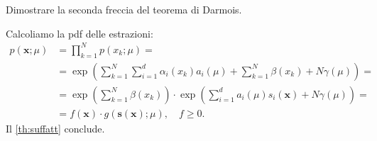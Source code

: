 \begin{exercise}
	Dimostrare la seconda freccia del teorema di Darmois.
\end{exercise}

\begin{solution}
	Calcoliamo la pdf delle estrazioni:
	\begin{align*}
		p(\mathbf x;\mu)
		&= \prod_{k=1}^N p(x_k;\mu) = \\
		&= \exp \left( \sum_{k=1}^N \sum_{i=1}^d \alpha_i(x_k)a_i(\mu)
		+ \sum_{k=1}^N \beta(x_k) + N\gamma(\mu) \right) = \\
		&= \exp \left( \sum_{k=1}^N \beta(x_k) \right)
		\cdot \exp \left( \sum_{i=1}^d a_i(\mu)s_i(\mathbf x) + N\gamma(\mu) \right) = \\
		&= f(\mathbf x) \cdot g(\mathbf s(\mathbf x);\mu), \quad f\ge0.
	\end{align*}
	Il \autoref{th:suffatt} conclude.
\end{solution}
